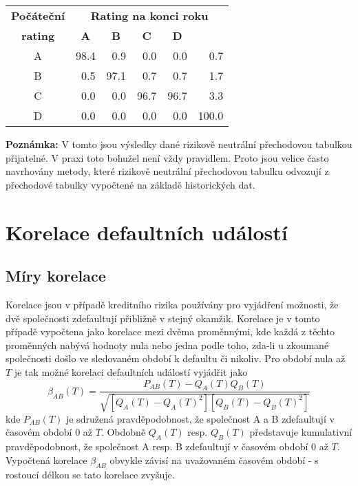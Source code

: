 \documentclass[a4paper]{book}
\begin{document}
\begin{center}
\begin{tabular}{c r r r r r}
\textbf{Počáteční} &
\multicolumn{5}{c}{\textbf{Rating na konci roku}} \\
\multicolumn{1}{c}{\textbf{rating}} &
\multicolumn{1}{c}{\textbf{A}} &
\multicolumn{1}{c}{\textbf{B}} &
\multicolumn{1}{c}{\textbf{C}} &
\multicolumn{1}{c}{\textbf{D}} \\
\hline
A &   98.4 &  0.9 &  0.0 &  0.0 &   0.7 \\
B &    0.5 & 97.1 &  0.7 &  0.7 &   1.7 \\
C &    0.0 &  0.0 & 96.7 & 96.7 &   3.3 \\
D &    0.0 &  0.0 &  0.0 &  0.0 & 100.0 \\
\hline
\end{tabular}
\end{center}
\textbf{Poznámka:} V tomto jsou výsledky dané rizikově neutrální přechodovou tabulkou přijatelné. V praxi toto bohužel není vždy pravidlem. Proto jsou velice často navrhovány metody, které rizikově neutrální přechodovou tabulku odvozují z přechodové tabulky vypočtené na základě historických dat.

\section{Korelace defaultních událostí}

\subsection{Míry korelace}

Korelace jsou v případě kreditního rizika používány pro vyjádření možnosti, že dvě společnosti zdefaultují přibližně v stejný okamžik. Korelace je v tomto případě vypočtena jako korelace mezi dvěma proměnnými, kde každá z těchto proměnných nabývá hodnoty nula nebo jedna podle toho, zda-li u zkoumané společnosti došlo ve sledovaném období k defaultu či nikoliv. Pro období nula až $T$ je tak možné korelaci defaultních událostí vyjádřit jako
\begin{equation*}
\beta_{AB}(T) = \frac{P_{AB}(T)-Q_A(T)Q_B(T)}{\sqrt{[Q_A(T)-Q_A(T)^2][Q_B(T)-Q_B(T)^2]}}
\end{equation*}
kde $P_{AB}(T)$ je sdružená pravděpodobnost, že společnost A a B zdefaultují v časovém období 0 až $T$. Obdobně $Q_A(T)$ resp. $Q_B(T)$ představuje kumulativní pravděpodobnost, že společnost A resp. B zdefaultují v časovém období 0 až $T$. Vypočtená korelace $\beta_{AB}$ obvykle závisí na uvažovaném časovém období - s rostoucí délkou se tato korelace zvyšuje.\\
\end{document}
